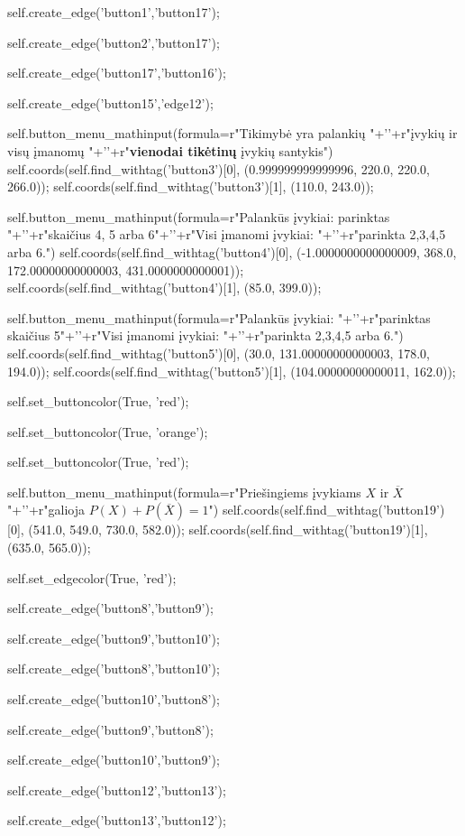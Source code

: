self.create_edge('button1','button17');

self.create_edge('button2','button17');

self.create_edge('button17','button16');

self.create_edge('button15','edge12');

self.button_menu_mathinput(formula=r"Tikimybė yra palankių "+'\n'+r"įvykių ir visų įmanomų "+'\n'+r"\textbf{vienodai tikėtinų} įvykių santykis")
self.coords(self.find_withtag('button3')[0], (0.999999999999996, 220.0, 220.0, 266.0));
self.coords(self.find_withtag('button3')[1], (110.0, 243.0));

self.button_menu_mathinput(formula=r"Palankūs įvykiai: parinktas "+'\n'+r"skaičius 4, 5 arba 6"+'\n'+r"Visi įmanomi įvykiai: "+'\n'+r"parinkta 2,3,4,5 arba 6.")
self.coords(self.find_withtag('button4')[0], (-1.0000000000000009, 368.0, 172.00000000000003, 431.0000000000001));
self.coords(self.find_withtag('button4')[1], (85.0, 399.0));

self.button_menu_mathinput(formula=r"Palankūs įvykiai: "+'\n'+r"parinktas skaičius 5"+'\n'+r"Visi įmanomi įvykiai: "+'\n'+r"parinkta 2,3,4,5 arba 6.")
self.coords(self.find_withtag('button5')[0], (30.0, 131.00000000000003, 178.0, 194.0));
self.coords(self.find_withtag('button5')[1], (104.00000000000011, 162.0));

self.set_buttoncolor(True, 'red');


self.set_buttoncolor(True, 'orange');

self.set_buttoncolor(True, 'red');

self.button_menu_mathinput(formula=r"Priešingiems įvykiams $X$ ir $\overline{X}$"+'\n'+r"galioja $P(X)+P(\overline{X})=1$")
self.coords(self.find_withtag('button19')[0], (541.0, 549.0, 730.0, 582.0));
self.coords(self.find_withtag('button19')[1], (635.0, 565.0));

self.set_edgecolor(True, 'red');

self.create_edge('button8','button9');

self.create_edge('button9','button10');

self.create_edge('button8','button10');

self.create_edge('button10','button8');

self.create_edge('button9','button8');

self.create_edge('button10','button9');

self.create_edge('button12','button13');

self.create_edge('button13','button12');

